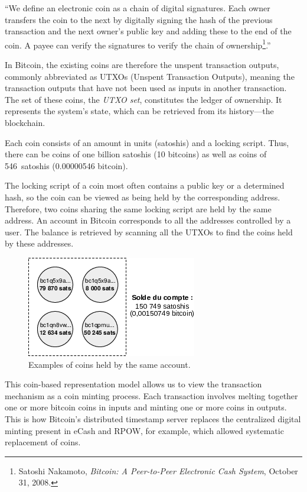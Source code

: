 \documentclass[
  a5paper,
  smalldemyvopaper,10pt,twoside,onecolumn,openright,extrafontsizes,hidelinks]{memoir}
\begin{document}
``We define an electronic coin as a chain of digital signatures. Each
owner transfers the coin to the next by digitally signing the hash of
the previous transaction and the next owner's public key and adding
these to the end of the coin. A payee can verify the signatures to
verify the chain of ownership\footnote{Satoshi Nakamoto, \emph{Bitcoin:
  A Peer-to-Peer Electronic Cash System}, October 31, 2008.}.''

In Bitcoin, the existing coins are therefore the unspent transaction
outputs, commonly abbreviated as UTXOs (Unspent Transaction Outputs),
meaning the transaction outputs that have not been used as inputs in
another transaction. The set of these coins, the \emph{UTXO set},
constitutes the ledger of ownership. It represents the system's state,
which can be retrieved from its history---the blockchain.

Each coin consists of an amount in units (satoshis) and a locking
script. Thus, there can be coins of one billion satoshis (10 bitcoins)
as well as coins of 546~satoshis (0.00000546 bitcoin).

The locking script of a coin most often contains a public key or a
determined hash, so the coin can be viewed as being held by the
corresponding address. Therefore, two coins sharing the same locking
script are held by the same address. An account in Bitcoin corresponds
to all the addresses controlled by a user. The balance is retrieved by
scanning all the UTXOs to find the coins held by these addresses.

\begin{figure}

{\centering \includegraphics{chapters/img/coins-utxos-account.png}

}

\caption{Examples of coins held by the same account.}

\end{figure}%

This coin-based representation model allows us to view the transaction
mechanism as a coin minting process. Each transaction involves melting
together one or more bitcoin coins in inputs and minting one or more
coins in outputs. This is how Bitcoin's distributed timestamp server
replaces the centralized digital minting present in eCash and RPOW, for
example, which allowed systematic replacement of coins.
\end{document}
